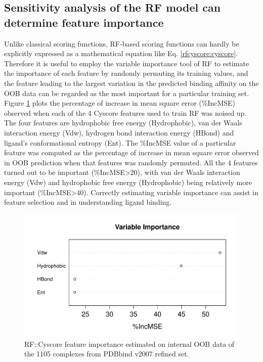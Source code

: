 \subsection{Sensitivity analysis of the RF model can determine feature importance}

Unlike classical scoring functions, RF-based scoring functions can hardly be explicitly expressed as a mathematical equation like Eq. \eqref{rfcyscore:cyscore}. Therefore it is useful to employ the variable importance tool of RF to estimate the importance of each feature by randomly permuting its training values, and the feature leading to the largest variation in the predicted binding affinity on the OOB data can be regarded as the most important for a particular training set. Figure \ref{rfcyscore:varimp} plots the percentage of increase in mean square error (\%IncMSE) observed when each of the 4 Cyscore features used to train RF was noised up. The four features are hydrophobic free energy (Hydrophobic), van der Waals interaction energy (Vdw), hydrogen bond interaction energy (HBond) and ligand's conformational entropy (Ent). The \%IncMSE value of a particular feature was computed as the percentage of increase in mean square error observed in OOB prediction when that features was randomly permuted. All the 4 features turned out to be important (\%IncMSE\textgreater 20), with van der Waals interaction energy (Vdw) and hydrophobic free energy (Hydrophobic) being relatively more important (\%IncMSE\textgreater 40). Correctly estimating variable importance can assist in feature selection and in understanding ligand binding.

\begin{figure}
\includegraphics[width=\linewidth]{../rfcyscore/varimp.pdf}
\caption{RF::Cyscore feature importance estimated on internal OOB data of the 1105 complexes from PDBbind v2007 refined set.}
\label{rfcyscore:varimp}
\end{figure}

